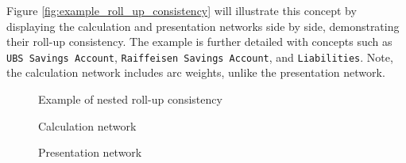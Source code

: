 Figure \ref{fig:example_roll_up_consistency} will illustrate this concept by displaying the calculation and presentation networks side by side,  
demonstrating their roll-up consistency.  
The example is further detailed with concepts such as \texttt{UBS Savings Account}, \texttt{Raiffeisen Savings Account}, and \texttt{Liabilities}.  
Note, the calculation network includes arc weights, unlike the presentation network.

\begin{figure}[H]
    \caption{Example of nested roll-up consistency}
    \label{fig:example_roll_up_consistency}
    \begin{minipage}{0.8\textwidth}
        \caption{Calculation network}
        \label{fig:example_roll_up_consistency_calculation}
    \end{minipage}
    \begin{minipage}{0.8\textwidth}
        \caption{Presentation network}
        \label{fig:example_roll_up_consistency_presentation}
    \end{minipage}
\end{figure}



